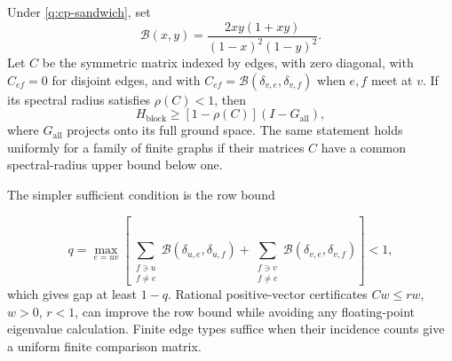 \begin{theorem}
\label{q:thm-wire-gap}
Under \eqref{q:cp-sandwich}, set
\begin{equation}
 \mathcal B(x,y)=\frac{2xy(1+xy)}{(1-x)^2(1-y)^2}.
 \label{q:Bxy}
\end{equation}
Let $C$ be the symmetric matrix indexed by edges, with zero diagonal,
with $C_{ef}=0$ for disjoint edges, and with
$C_{ef}=\mathcal B(\delta_{v,e},\delta_{v,f})$ when $e,f$ meet at $v$.
If its spectral radius satisfies $\rho(C)<1$, then
\begin{equation}
 H_{\mathrm{block}}\geq
 [1-\rho(C)](I-G_{\mathrm{all}}),
 \label{q:block-gap}
\end{equation}
where $G_{\mathrm{all}}$ projects onto its full ground space.
The same statement holds uniformly for a family of finite graphs if
their matrices $C$ have a common spectral-radius upper bound below one.
\end{theorem}

The simpler sufficient condition is the row bound

\begin{equation}
 q=\max_{e=uv}\left[
 \sum_{\substack{f\ni u\\f\ne e}}
       \mathcal B(\delta_{u,e},\delta_{u,f})+
 \sum_{\substack{f\ni v\\f\ne e}}
       \mathcal B(\delta_{v,e},\delta_{v,f})\right]<1,
 \label{q:row-criterion}
\end{equation}
which gives gap at least $1-q$.  Rational positive-vector certificates
$Cw\leq rw$, $w>0$, $r<1$, can improve the row bound while avoiding any
floating-point eigenvalue calculation.  Finite edge types suffice when
their incidence counts give a uniform finite comparison matrix.

